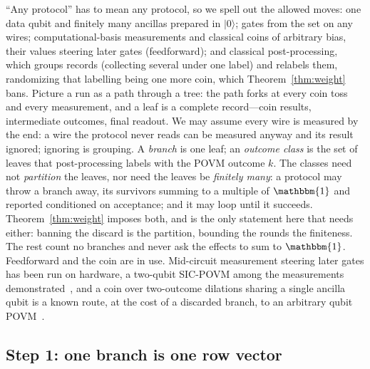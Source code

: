 \documentclass[11pt,a4paper]{article}
\newcommand{\Id}{\mathbbm{1}}
\newcommand{\ket}[1]{|#1\rangle}
\begin{document}
``Any protocol'' has to mean any protocol, so we spell out the allowed moves: one data qubit and finitely many ancillas prepared in $\ket{0}$; gates from the set on any wires; computational-basis measurements and classical coins of arbitrary bias, their values steering later gates (feedforward); and classical post-processing, which groups records (collecting several under one label) and relabels them, randomizing that labelling being one more coin, which Theorem~\ref{thm:weight} bans. Picture a run as a path through a tree: the path forks at every coin toss and every measurement, and a leaf is a complete record---coin results, intermediate outcomes, final readout. We may assume every wire is measured by the end: a wire the protocol never reads can be measured anyway and its result ignored; ignoring is grouping. A \textit{branch} is one leaf; an \textit{outcome class} is the set of leaves that post-processing labels with the POVM outcome $k$. The classes need not \textit{partition} the leaves, nor need the leaves be \textit{finitely many}: a protocol may throw a branch away, its survivors summing to a multiple of $\Id$ and reported conditioned on acceptance; and it may loop until it succeeds. Theorem~\ref{thm:weight} imposes both, and is the only statement here that needs either: banning the discard is the partition, bounding the rounds the finiteness. The rest count no branches and never ask the effects to sum to $\Id$. Feedforward and the coin are in use. Mid-circuit measurement steering later gates has been run on hardware, a two-qubit SIC-POVM among the measurements demonstrated~\cite[\S IV and Fig.~1]{ivashkov2024highfidelitymultiqubitgeneralized}, and a coin over two-outcome dilations sharing a single ancilla qubit is a known route, at the cost of a discarded branch, to an arbitrary qubit POVM~\cite[Thm.~1]{singal2022implementationquantummeasurements}.

\subsection{Step 1: one branch is one row vector} \label{sec:decker:step1}
\end{document}
